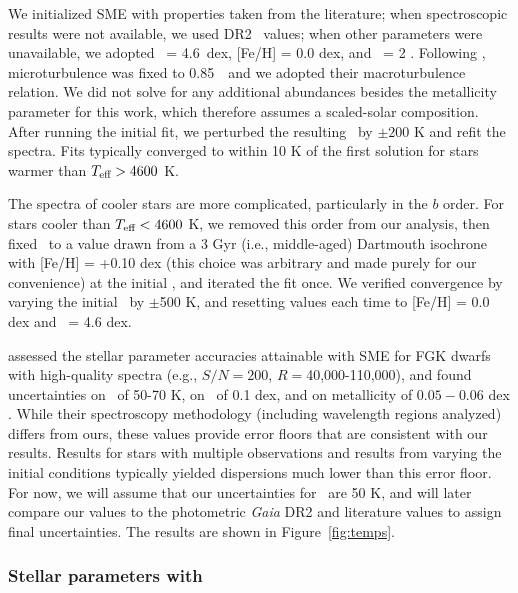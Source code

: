 We initialized SME with properties taken from the literature; when spectroscopic results were not 
available, we used \gaia DR2 \teff\ values; 
when other parameters were unavailable, we adopted 
\logg\ = 4.6~dex, [Fe/H] = 0.0 dex, and \vsini\ = 2 \kms.
Following \citet{Valenti2005}, 
microturbulence was fixed to 0.85~\kms\ and we
adopted their macroturbulence relation. 
We did not solve for any additional abundances besides the metallicity parameter for this work,
which therefore assumes a scaled-solar composition.
After running the initial fit, 
we perturbed the resulting \teff\ by $\pm200$ K and refit the spectra. 
Fits typically converged to within 10 K of the first solution for 
stars warmer than $T_{\mbox{\scriptsize eff}} > 4600$ K.

The spectra of cooler stars are more complicated, particularly in 
the  $b$ order. 
For stars cooler than $T_{\mbox{\scriptsize eff}} < 4600$ K,
we removed this order from our analysis, 
then fixed \logg\ to a value drawn from a 3 Gyr (i.e., middle-aged) Dartmouth isochrone with [Fe/H] = +0.10 dex 
(this choice was arbitrary and made purely for our convenience) 
at the initial \teff , 
and iterated the fit once.
We verified convergence by  
varying the initial \teff\ by $\pm$500 K, 
and resetting values each time to [Fe/H] = 0.0 dex and \logg\ = 4.6 dex.

\citet{Ryabchikova2016} assessed the stellar parameter accuracies attainable with SME 
for FGK dwarfs with high-quality spectra (e.g., $S/N = 200$, $R = $40,000-110,000), 
and found uncertainties on
\teff\ of 50-70 K, 
on \logg\ of 0.1 dex,
and 
on metallicity of $0.05-0.06$ dex \citep[see also][]{Piskunov2017, Brewer2016}.
While their spectroscopy methodology (including wavelength regions analyzed) 
differs from ours, 
these values provide error floors that are consistent with our results.
Results for stars with multiple observations and results from varying the initial conditions 
typically yielded dispersions much lower than this error floor.
For now, we will assume that our uncertainties for 
\teff\ are 50 K, and will later compare our values to 
the photometric \textit{Gaia} DR2 and literature values to 
assign final uncertainties. The results are shown in Figure~\ref{fig:temps}.

\subsubsection{Stellar parameters with \moog} \label{sec:moog}
 
